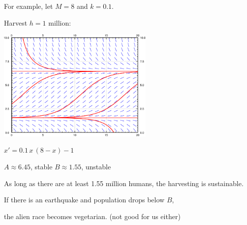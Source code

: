 \documentclass[10pt,aspectratio=169]{beamer}
\begin{document}
\begin{frame}
For example, let $M=8$ and $k=0.1$.

\medskip
\pause

Harvest $h=1$ million:

\vspace*{-\baselineskip}

 \hspace*{1.5in} \includegraphics[width=3in]{../figures/2-2-logistic-h1}

 \hspace*{1.5in} $x' = 0.1\,x\,(8-x)-1$

\pause
\medskip

$A \approx 6.45$, \pause stable
\pause
\qquad
$B \approx 1.55$, \pause unstable

\medskip
\pause

As long as there are at least 1.55 million humans,
the harvesting is sustainable.

\medskip
\pause

If there is an earthquake and population drops below $B$,

\pause
the alien race becomes vegetarian. (not good for us either)
\end{frame}
\end{document}
